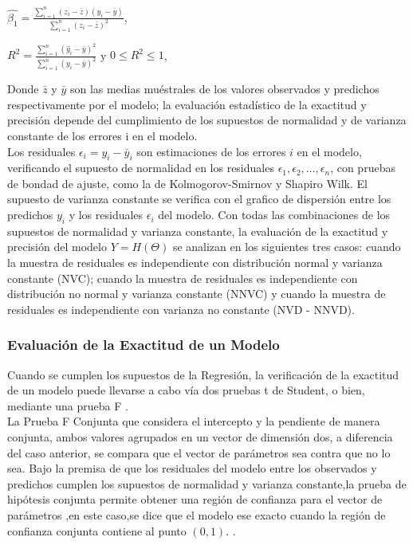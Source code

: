 \begin{center}
	$ \hat{\beta_{1}} = \frac{\sum_{i=1}^{n} (z_{i} - \bar{z} ) (y_{i} - \bar{y})} {  \sum_{i=1}^{n} (z_{i} - \bar{z} )^{2} }$, \\
\end{center}

\begin{center}
	$R^{2} = \frac{ \sum_{i=1}^{n} ( \hat{y}_{i} - \bar{y})^{2}} { \sum_{i=1}^{n} ( y_{i} - \bar{y})^{2}  }$  y  $ 0 \leq R^{2} \leq 1$,
\end{center}


Donde $ \bar{z}$ y $ \bar{y}$ son las medias muéstrales de los valores observados y predichos respectivamente por el modelo; la evaluación estadístico de la exactitud y precisión depende del cumplimiento de los supuestos de normalidad y de varianza constante de los errores i en el modelo. \\


Los residuales $\epsilon_{i} = y_{i} - \bar{y}_{i}$ son estimaciones de los errores $i$ en el modelo, verificando el  supuesto de normalidad en los residuales $\epsilon_{1}, \epsilon_{2} , \dots, \epsilon_{n} $, con pruebas de bondad de ajuste, como la de Kolmogorov-Smirnov y Shapiro Wilk. El supuesto de varianza constante se verifica con el grafico de dispersión entre los predichos $y_{i}$ y los residuales $\epsilon_{i}$ del modelo. Con todas las combinaciones de los supuestos de normalidad y varianza constante, la evaluación de la exactitud y precisión del modelo $Y = H(\Theta )$ se analizan en los siguientes tres casos: cuando la muestra de residuales es independiente con distribución normal y varianza constante (NVC); cuando la muestra de residuales es independiente con distribución no normal y varianza constante (NNVC) y cuando la muestra
de residuales es independiente con varianza no constante (NVD - NNVD).

\subsubsection{Evaluación de la Exactitud de un Modelo}

Cuando se cumplen los supuestos de la Regresión, la verificación de la exactitud de un modelo puede llevarse a cabo vía dos pruebas t de Student, o bien, mediante una prueba F \parencite{balam-2012}.\\

La Prueba F Conjunta que considera el intercepto y la pendiente de manera conjunta, ambos valores agrupados en un vector de dimensión dos, a diferencia del caso anterior, se compara que el vector de parámetros  sea  contra que no lo sea. Bajo la premisa de que los residuales del modelo entre los observados y predichos cumplen los supuestos de normalidad y varianza constante,la prueba de hipótesis conjunta permite obtener una región de confianza para el vector de parámetros ,en este caso,se dice que el modelo ese exacto cuando la región de confianza conjunta contiene al punto $(0,1)$. \parencite{zacarias-2023}.\\

